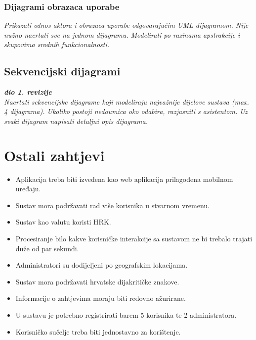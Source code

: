 					
				\subsubsection{Dijagrami obrazaca uporabe}
					
					\textit{Prikazati odnos aktora i obrazaca uporabe odgovarajućim UML dijagramom. Nije nužno nacrtati sve na jednom dijagramu. Modelirati po razinama apstrakcije i skupovima srodnih funkcionalnosti.}
				\eject		
				
			\subsection{Sekvencijski dijagrami}
				
				\textbf{\textit{dio 1. revizije}}\\
				
				\textit{Nacrtati sekvencijske dijagrame koji modeliraju najvažnije dijelove sustava (max. 4 dijagrama). Ukoliko postoji nedoumica oko odabira, razjasniti s asistentom. Uz svaki dijagram napisati detaljni opis dijagrama.}
				\eject
	
		\section{Ostali zahtjevi}
		
		\begin{itemize}
			\item Aplikacija treba biti izvedena kao web aplikacija prilagođena mobilnom uređaju.
			\item Sustav mora podržavati rad više korisnika u stvarnom vremenu.
			\item Sustav kao valutu koristi HRK.
			\item Procesiranje bilo kakve korisničke interakcije sa sustavom ne bi trebalo trajati duže od par sekundi.
			\item Administratori su dodijeljeni po geografskim lokacijama.
			\item Sustav mora podržavati hrvatske dijakritičke znakove.
			\item Informacije o zahtjevima moraju biti redovno ažurirane.
			\item U sustavu je potrebno registrirati barem 5 korisnika te 2 administratora.
			\item Korisničko sučelje treba biti jednostavno za korištenje.
		\end{itemize}
			 
			 
			 
	